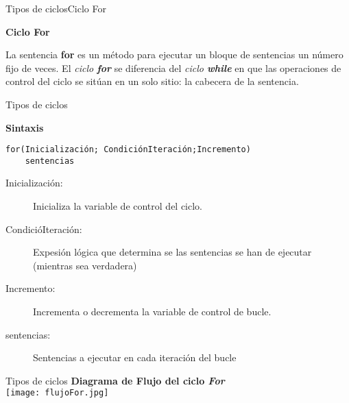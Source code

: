 
\begin{frame}{Tipos de ciclos}{Ciclo For}
\begin{center}
    \textbf{Ciclo For}
\end{center}
La sentencia \textbf{for} es un método para ejecutar un bloque de sentencias un número fijo de veces. El \textit{ciclo \textbf{for}} se diferencia del \textit{ciclo \textbf{while}} en que las operaciones de control del ciclo se sitúan en un solo sitio: la cabecera de la sentencia.
\end{frame}

\begin{frame}[fragile, t]{Tipos de ciclos}
    \begin{center}
        \textbf{Sintaxis}
    \end{center}
    \vspace{-5mm}
    \begin{lstlisting}[basicstyle=\ttfamily\small]
for(Inicialización; CondiciónIteración;Incremento)
    sentencias
\end{lstlisting}
    \vspace{-3mm}
{\small \begin{description}
    \item[Inicialización:] Inicializa la variable de control del ciclo.\pause
    \item[CondicióIteración:] Expesión lógica que determina se las sentencias se han de ejecutar (mientras sea verdadera)\pause
    \item[Incremento:] Incrementa o decrementa la variable de control de bucle.\pause
    \item[sentencias:] Sentencias a ejecutar en cada iteración del bucle
\end{description}}
\end{frame}


\begin{frame}{Tipos de ciclos}
    \centering
    \textbf{Diagrama de Flujo del ciclo \textit{For}}\\
    \vspace{3mm}
    \texttt{[image: flujoFor.jpg]}
\end{frame}



